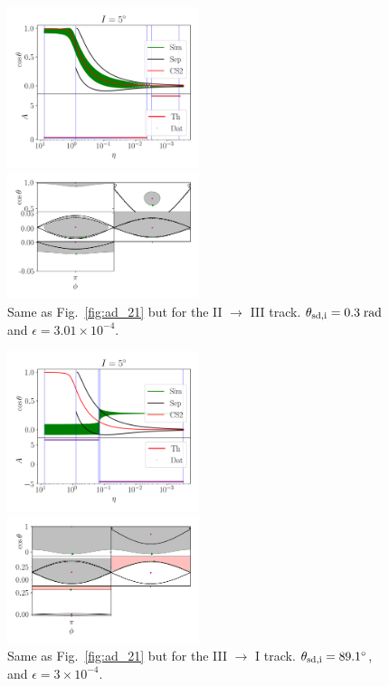\documentclass[
        fleqn,
        usenatbib,
    ]{mnras}
\begin{document}
\begin{figure}
    \centering
    \includegraphics[width=0.5\textwidth]{plots_diskdisp/3testo23.png}

    \includegraphics[width=0.5\textwidth]{plots_diskdisp/3testo23_subplots.png}
    \caption{Same as Fig.~\ref{fig:ad_21} but for the II $\to$ III track.
    $\theta_{\rm sd, i} = 0.3\;\mathrm{rad}$ and $\epsilon = 3.01 \times
    10^{-4}$.}\label{fig:ad_23}
\end{figure}
\begin{figure}
    \centering
    \includegraphics[width=0.5\textwidth]{plots_diskdisp/3testo31.png}

    \includegraphics[width=0.5\textwidth]{plots_diskdisp/3testo31_subplots.png}
    \caption{Same as Fig.~\ref{fig:ad_21} but for the III $\to$ I track.
    $\theta_{\rm sd, i} = 89.1^\circ$, and $\epsilon = 3 \times
    10^{-4}$.}\label{fig:ad_31}
\end{figure}
\end{document}
